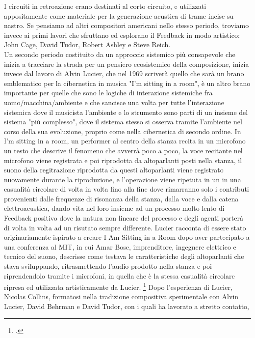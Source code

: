 I circuiti in retroazione erano destinati al corto circuito,
e utilizzati appositamente come materiale per la generazione acustica
di trame incise su nastro.
Se pensiamo ad altri compositori americani nello stesso periodo,
troviamo invece ai primi lavori che sfruttano
ed esplorano il Feedback in modo artistico:
John Cage, David Tudor, Robert Ashley e Steve Reich. \\
Un secondo periodo costituito da un approccio sistemico più consapevole
che inizia a tracciare la strada per un pensiero ecosistemico della composizione,
inizia invece dal lavoro
di Alvin Lucier, che nel 1969 scriverà quello che sarà un brano emblematico per
la cibernetica in musica "I'm sitting in a room",
è un altro brano importante per quelle che sono
le logiche di interazione sistemiche fra uomo/macchina/ambiente
e che sancisce una volta per tutte
l'interazione sistemica dove il musicista l'ambiente e lo strumento
sono parti di un insieme del sistema "più complesso",
dove il sistema stesso si osserva tramite l'ambiente nel corso della sua
evoluzione,
proprio come nella cibernetica di secondo ordine.
In I'm sitting in a room, un performer al centro della stanza
recita in un microfono un testo che descrive il fenomeno che avverrà poco a poco,
la voce recitante nel microfono viene registrata e poi riprodotta da altoparlanti
posti nella stanza, il suono della regitrazione riprodotta da questi altoparlanti
viene registrato nuovamente durante la riproduzione, e l'operazione
viene ripetuta in un in una casualità circolare di volta in volta
fino alla fine dove rimarranno
solo i contributi provenienti dalle frequenze di risonanza della stanza,
dalla voce e dalla catena elettroacustica,
dando vita nel loro insieme ad un processo molto lento di Feedback positivo dove
la natura non lineare del processo e degli agenti porterà di volta in volta ad un risutato
sempre differente.
Lucier racconta di essere stato originariamente ispirato
a creare I Am Sitting in a Room dopo aver partecipato a una conferenza al MIT,
in cui Amar Bose, imprenditore, ingegnere elettrico e tecnico del suono,
descrisse come testava le caratteristiche degli altoparlanti
che stava sviluppando, ritrasmettendo l'audio prodotto nella stanza e poi
riprendendolo tramite i microfoni, in quella che è la stessa casualità
circolare ripresa ed utilizzata artisticamente da Lucier. \footcite{lucierbose}
Dopo l'esperienza di Lucier, Nicolas Collins,
formatosi nella tradizione compositiva sperimentale con Alvin Lucier,
David Behrman e David Tudor, con i quali ha lavorato a stretto contatto,
